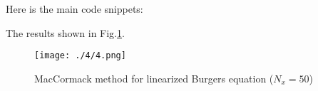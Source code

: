 \documentclass[12pt,a4paper]{article} %
\begin{document}
\begin{CJK}{UTF8}{song}
Here is the main code snippets:


The results shown in Fig.\ref{Fig.4}.
\begin{figure}[htbp]
\centering
{
    \texttt{[image: ./4/4.png]}
}
\caption{MacCormack method for linearized Burgers equation ($N_{x}=50$)} \label{Fig.4}
\end{figure}



%
\end{CJK} %
\end{document}
